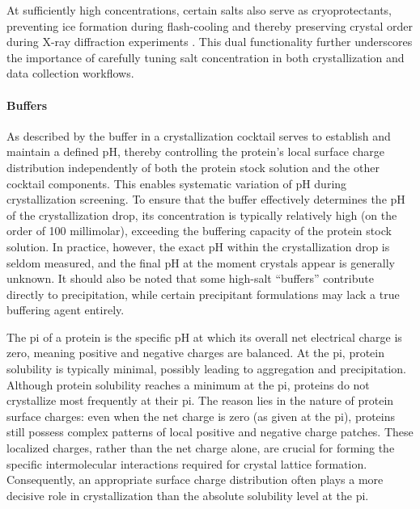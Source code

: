 At sufficiently high concentrations, certain salts also serve as cryoprotectants, preventing ice formation during flash-cooling and thereby preserving crystal order during X-ray diffraction experiments \parencite{Rubinson2000}. This dual functionality further underscores the importance of carefully tuning salt concentration in both crystallization and data collection workflows.

\paragraph{Buffers}
As described by \textcite{Rupp2009} the buffer in a crystallization cocktail serves to establish and maintain a defined pH, thereby controlling the protein’s local surface charge distribution independently of both the protein stock solution and the other cocktail components. This enables systematic variation of pH during crystallization screening. To ensure that the buffer effectively determines the pH of the crystallization drop, its concentration is typically relatively high (on the order of 100 millimolar), exceeding the buffering capacity of the protein stock solution. In practice, however, the exact pH within the crystallization drop is seldom measured, and the final pH at the moment crystals appear is generally unknown. It should also be noted that some high-salt “buffers” contribute directly to precipitation, while certain precipitant formulations may lack a true buffering agent entirely.

The \gls{pi} of a protein is the specific pH at which its overall net electrical charge is zero, meaning positive and negative charges are balanced. At the \gls{pi}, protein solubility is typically minimal, possibly leading to aggregation and precipitation. Although protein solubility reaches a minimum at the \gls{pi}, proteins do not crystallize most frequently at their \gls{pi}. The reason lies in the nature of protein surface charges: even when the net charge is zero (as given at the \gls{pi}), proteins still possess complex patterns of local positive and negative charge patches. These localized charges, rather than the net charge alone, are crucial for forming the specific intermolecular interactions required for crystal lattice formation. Consequently, an appropriate surface charge distribution often plays a more decisive role in crystallization than the absolute solubility level at the \gls{pi}.